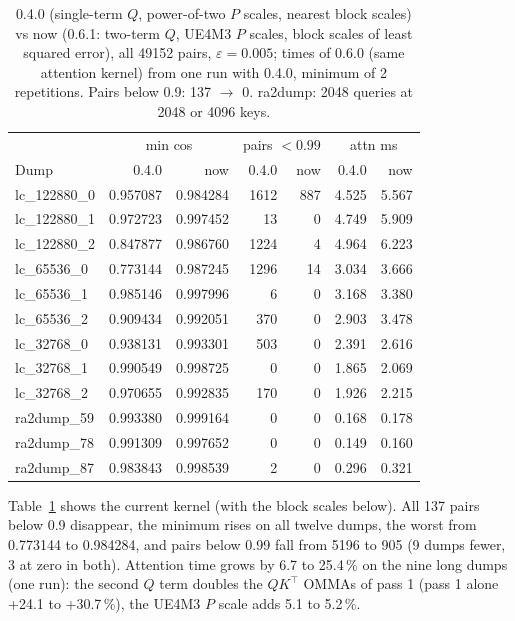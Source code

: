 \documentclass[10pt,twocolumn]{article}
\newcommand{\eps}{\varepsilon}
\begin{document}
\begin{table}[t]
\centering\footnotesize
\setlength{\tabcolsep}{2pt}
\begin{tabular}{@{}lrrrrrr@{}}
\toprule
 & \multicolumn{2}{c}{min cos} & \multicolumn{2}{c}{pairs $<0.99$} & \multicolumn{2}{c}{attn ms} \\
Dump & 0.4.0 & now & 0.4.0 & now & 0.4.0 & now \\
\midrule
lc\_122880\_0 & 0.957087 & 0.984284 & 1612 & 887 & 4.525 & 5.567 \\
lc\_122880\_1 & 0.972723 & 0.997452 & 13 & 0 & 4.749 & 5.909 \\
lc\_122880\_2 & 0.847877 & 0.986760 & 1224 & 4 & 4.964 & 6.223 \\
lc\_65536\_0 & 0.773144 & 0.987245 & 1296 & 14 & 3.034 & 3.666 \\
lc\_65536\_1 & 0.985146 & 0.997996 & 6 & 0 & 3.168 & 3.380 \\
lc\_65536\_2 & 0.909434 & 0.992051 & 370 & 0 & 2.903 & 3.478 \\
lc\_32768\_0 & 0.938131 & 0.993301 & 503 & 0 & 2.391 & 2.616 \\
lc\_32768\_1 & 0.990549 & 0.998725 & 0 & 0 & 1.865 & 2.069 \\
lc\_32768\_2 & 0.970655 & 0.992835 & 170 & 0 & 1.926 & 2.215 \\
ra2dump\_59 & 0.993380 & 0.999164 & 0 & 0 & 0.168 & 0.178 \\
ra2dump\_78 & 0.991309 & 0.997652 & 0 & 0 & 0.149 & 0.160 \\
ra2dump\_87 & 0.983843 & 0.998539 & 2 & 0 & 0.296 & 0.321 \\
\bottomrule
\end{tabular}
\caption{0.4.0 (single-term $Q$, power-of-two $P$ scales, nearest block scales) vs now (0.6.1: two-term $Q$, UE4M3
$P$ scales, block scales of least squared error), all 49152 pairs, $\eps=0.005$; times of 0.6.0 (same attention
kernel) from one run with 0.4.0, minimum of 2 repetitions. Pairs below 0.9: 137 $\to$ 0. ra2dump: 2048 queries
at 2048 or 4096 keys.}
\label{tab:q2}
\end{table}

Table~\ref{tab:q2} shows the current kernel (with the block scales below). All 137 pairs below 0.9 disappear,
the minimum rises on all twelve dumps, the worst from 0.773144 to 0.984284, and pairs below 0.99 fall from 5196 to 905
(9 dumps fewer, 3 at zero in both). Attention time grows by 6.7 to 25.4\,\% on the nine long dumps (one run): the
second $Q$ term doubles the $QK^\top$ OMMAs of pass 1 (pass 1 alone +24.1 to +30.7\,\%), the UE4M3 $P$ scale adds
5.1 to 5.2\,\%.
\end{document}

